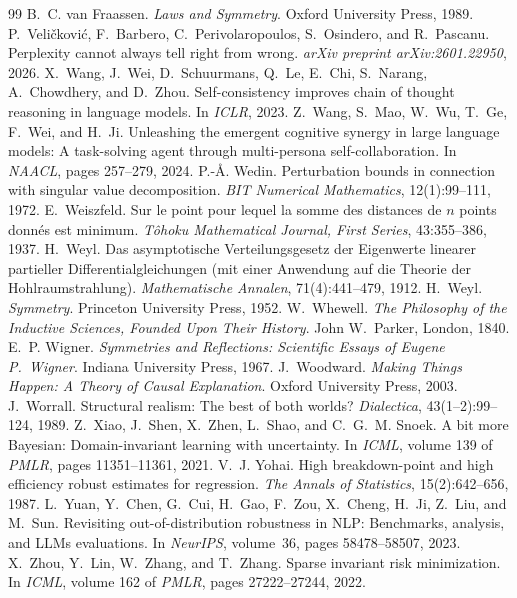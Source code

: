 \documentclass[11pt,a4paper]{article}
\theoremstyle{definition}
\theoremstyle{remark}
\begin{document}
\begin{thebibliography}{99}
 B.~C. van Fraassen. \emph{Laws and Symmetry}. Oxford University Press, 1989.
 P.~Veli\v{c}kovi\'c, F.~Barbero, C.~Perivolaropoulos, S.~Osindero, and R.~Pascanu. Perplexity cannot always tell right from wrong. \emph{arXiv preprint arXiv:2601.22950}, 2026.
 X.~Wang, J.~Wei, D.~Schuurmans, Q.~Le, E.~Chi, S.~Narang, A.~Chowdhery, and D.~Zhou. Self-consistency improves chain of thought reasoning in language models. In \emph{ICLR}, 2023.
 Z.~Wang, S.~Mao, W.~Wu, T.~Ge, F.~Wei, and H.~Ji. Unleashing the emergent cognitive synergy in large language models: A task-solving agent through multi-persona self-collaboration. In \emph{NAACL}, pages 257--279, 2024.
 P.-\AA. Wedin. Perturbation bounds in connection with singular value decomposition. \emph{BIT Numerical Mathematics}, 12(1):99--111, 1972.
 E.~Weiszfeld. Sur le point pour lequel la somme des distances de $n$ points donn\'es est minimum. \emph{T\^ohoku Mathematical Journal, First Series}, 43:355--386, 1937.
 H.~Weyl. Das asymptotische {V}erteilungsgesetz der {E}igenwerte linearer partieller {D}ifferentialgleichungen (mit einer {A}nwendung auf die {T}heorie der {H}ohlraumstrahlung). \emph{Mathematische Annalen}, 71(4):441--479, 1912.
 H.~Weyl. \emph{Symmetry}. Princeton University Press, 1952.
 W.~Whewell. \emph{The Philosophy of the Inductive Sciences, Founded Upon Their History}. John W.\ Parker, London, 1840.
 E.~P. Wigner. \emph{Symmetries and Reflections: Scientific Essays of Eugene P.\ Wigner}. Indiana University Press, 1967.
 J.~Woodward. \emph{Making Things Happen: A Theory of Causal Explanation}. Oxford University Press, 2003.
 J.~Worrall. Structural realism: The best of both worlds? \emph{Dialectica}, 43(1--2):99--124, 1989.
 Z.~Xiao, J.~Shen, X.~Zhen, L.~Shao, and C.~G.~M. Snoek. A bit more {B}ayesian: Domain-invariant learning with uncertainty. In \emph{ICML}, volume 139 of \emph{PMLR}, pages 11351--11361, 2021.
 V.~J. Yohai. High breakdown-point and high efficiency robust estimates for regression. \emph{The Annals of Statistics}, 15(2):642--656, 1987.
 L.~Yuan, Y.~Chen, G.~Cui, H.~Gao, F.~Zou, X.~Cheng, H.~Ji, Z.~Liu, and M.~Sun. Revisiting out-of-distribution robustness in {NLP}: Benchmarks, analysis, and {LLMs} evaluations. In \emph{NeurIPS}, volume~36, pages 58478--58507, 2023.
 X.~Zhou, Y.~Lin, W.~Zhang, and T.~Zhang. Sparse invariant risk minimization. In \emph{ICML}, volume 162 of \emph{PMLR}, pages 27222--27244, 2022.
\end{thebibliography}
\end{document}
